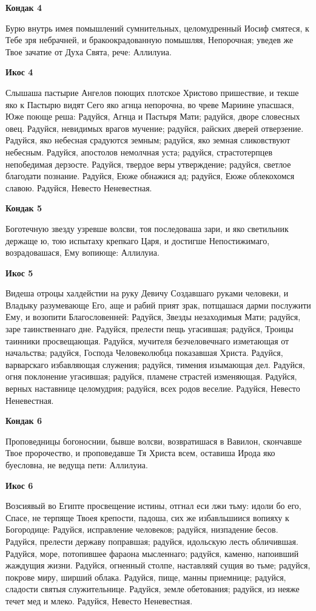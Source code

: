 \bfseries Кондак 4\normalfont{}


Бурю внутрь имея помышлений сумнительных, целомудренный Иосиф смятеся, к Тебе зря небрачней, и бракоокрадованную помышляя, Непорочная; уведев же Твое зачатие от Духа Свята, рече: Аллилуиа.


\bfseries Икос 4\normalfont{}


Слышаша пастырие Ангелов поющих плотское Христово пришествие, и текше яко к Пастырю видят Сего яко агнца непорочна, во чреве Мариине упасшася, Юже поюще реша: Радуйся, Агнца и Пастыря Мати; радуйся, дворе словесных овец. Радуйся, невидимых врагов мучение; радуйся, райских дверей отверзение. Радуйся, яко небесная срадуются земным; радуйся, яко земная сликовствуют небесным. Радуйся, апостолов немолчная уста; радуйся, страстотерпцев непобедимая дерзосте. Радуйся, твердое веры утверждение; радуйся, светлое благодати познание. Радуйся, Еюже обнажися ад; радуйся, Еюже облекохомся славою. Радуйся, Невесто Неневестная.


\bfseries Кондак 5\normalfont{}


Боготечную звезду узревше волсви, тоя последоваша зари, и яко светильник держаще ю, тою испытаху крепкаго Царя, и достигше Непостижимаго, возрадовашася, Ему вопиюще: Аллилуиа.


\bfseries Икос 5\normalfont{}


Видеша отроцы халдейстии на руку Девичу Создавшаго руками человеки, и Владыку разумевающе Его, аще и рабий прият зрак, потщашася дарми послужити Ему, и возопити Благословенней: Радуйся, Звезды незаходимыя Мати; радуйся, заре таинственнаго дне. Радуйся, прелести пещь угасившая; радуйся, Троицы таинники просвещающая. Радуйся, мучителя безчеловечнаго изметающая от начальства; радуйся, Господа Человеколюбца показавшая Христа. Радуйся, варварскаго избавляющая служения; радуйся, тимения изымающая дел. Радуйся, огня поклонение угасившая; радуйся, пламене страстей изменяющая. Радуйся, верных наставнице целомудрия; радуйся, всех родов веселие. Радуйся, Невесто Неневестная.


\bfseries Кондак 6\normalfont{}


Проповедницы богоноснии, бывше волсви, возвратишася в Вавилон, скончавше Твое пророчество, и проповедавше Тя Христа всем, оставиша Ирода яко буесловна, не ведуща пети: Аллилуиа.


\bfseries Икос 6\normalfont{}


Возсиявый во Египте просвещение истины, отгнал еси лжи тьму: идоли бо его, Спасе, не терпяще Твоея крепости, падоша, сих же избавльшиися вопияху к Богородице: Радуйся, исправление человеков; радуйся, низпадение бесов. Радуйся, прелести державу поправшая; радуйся, идольскую лесть обличившая. Радуйся, море, потопившее фараона мысленнаго; радуйся, каменю, напоивший жаждущия жизни. Радуйся, огненный столпе, наставляяй сущия во тьме; радуйся, покрове миру, ширший облака. Радуйся, пище, манны приемнице; радуйся, сладости святыя служительнице. Радуйся, земле обетования; радуйся, из неяже течет мед и млеко. Радуйся, Невесто Неневестная.



